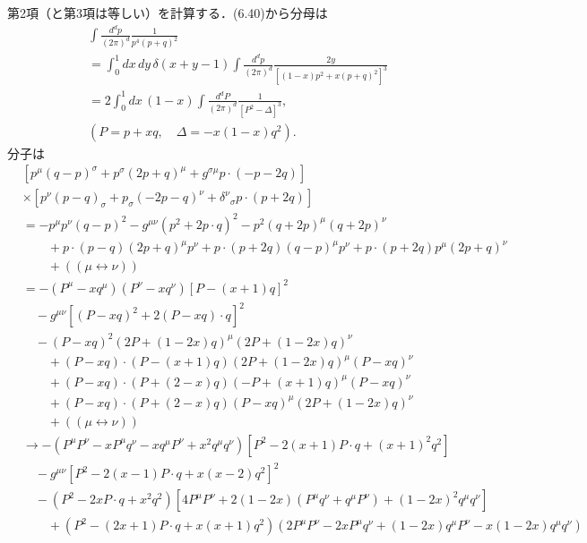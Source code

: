 第2項（と第3項は等しい）を計算する．(6.40)から分母は
\begin{align*}
  & \int \frac{d^dp}{(2\pi)^d} \frac{1}{p^4(p+q)^2} \\
  &= \int_0^1 dx \, dy \, \delta(x+y-1) \int \frac{d^dp}{(2\pi)^d} \frac{2y}{[(1-x) p^2 + x (p+q)^2]^3} \\
  &= 2 \int_0^1 dx \, (1-x) \int \frac{d^dP}{(2\pi)^d} \frac{1}{[P^2 - \Delta]^3} , \\
  & ( P = p + xq , \quad \Delta = - x(1-x) q^2 ) .
\end{align*}
分子は
\begin{align*}
  & \left[ p^\mu (q-p)^\sigma + p^\sigma (2p+q)^\mu + g^{\sigma\mu} p \cdot (-p-2q) \right] \\
  & \times \left[ p^\nu (p-q)_\sigma + p_\sigma (-2p-q)^\nu + \delta^\nu{}_\sigma p \cdot (p+2q) \right] \\
  &= - p^\mu p^\nu (q-p)^2 - g^{\mu\nu} (p^2 + 2p \cdot q)^2 - p^2 (q+2p)^\mu (q+2p)^\nu \\
  & \qquad %
  + p \cdot (p-q) (2p+q)^\mu p^\nu
  + p \cdot (p+2q) (q-p)^\mu p^\nu
  + p \cdot (p+2q) p^\mu (2p+q)^\nu \\
  & \qquad + (\!( \mu\leftrightarrow\nu )\!) \\
  &= - (P^\mu - xq^\mu)(P^\nu - xq^\nu) [P - (x+1)q]^2 \\
  &\quad - g^{\mu\nu} \left[ (P - xq)^2 + 2(P - xq) \cdot q \right]^2 \\
  &\quad - (P-xq)^2 (2P + (1-2x)q)^\mu (2P + (1-2x)q)^\nu \\
  &\qquad + (P-xq) \cdot (P - (x+1)q) (2P + (1-2x)q)^\mu (P-xq)^\nu \\
  &\qquad + (P-xq) \cdot (P + (2-x)q) (-P+(x+1)q)^\mu (P-xq)^\nu \\
  &\qquad + (P-xq) \cdot (P + (2-x)q) (P-xq)^\mu (2P + (1-2x)q)^\nu \\
  &\qquad + (\!( \mu\leftrightarrow\nu )\!) \\
  &\to - (P^\mu P^\nu - x P^\mu q^\nu - x q^\mu P^\nu + x^2 q^\mu q^\nu) \left[ P^2 - 2(x+1)P \cdot q + (x+1)^2 q^2 \right] \\
  &\quad - g^{\mu\nu} \left[ P^2 - 2(x-1) P \cdot q + x(x-2) q^2 \right]^2 \\
  &\quad - (P^2 - 2x P \cdot q + x^2q^2) [4P^\mu P^\nu +2(1-2x) (P^\mu q^\nu + q^\mu P^\nu) + (1-2x)^2 q^\mu q^\nu] \\
  &\qquad + (P^2 - (2x+1) P \cdot q + x(x+1) q^2)
  (2P^\mu P^\nu - 2xP^\mu q^\nu + (1-2x) q^\mu P^\nu - x(1-2x) q^\mu q^\nu) \\

\end{align*}
